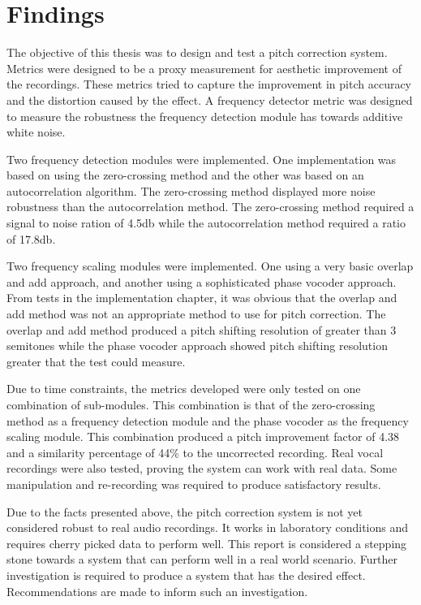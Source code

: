 
\section{Findings}

The objective of this thesis was to design and test a pitch correction system.
Metrics were designed to be a proxy measurement for aesthetic improvement of the
recordings. These metrics tried to capture the improvement in pitch accuracy and
the distortion caused by the effect. A frequency detector metric was designed to
measure the robustness the frequency detection module has towards additive white
noise.

Two frequency detection modules were implemented. One implementation was based on
using the zero-crossing method and the other was based on an autocorrelation
algorithm. The zero-crossing method displayed more noise robustness than the
autocorrelation method. The zero-crossing method required a signal to noise ration
of 4.5db while the autocorrelation method required a ratio of 17.8db.

Two frequency scaling modules were implemented. One using a very basic overlap and
add approach, and another using a sophisticated phase vocoder approach. From tests
in the implementation chapter, it was obvious that the overlap and add method was
not an appropriate method to use for pitch correction. The overlap and add method
produced a pitch shifting resolution of greater than 3 semitones while the phase
vocoder approach showed pitch shifting resolution greater that the test could
measure.

Due to time constraints, the metrics developed were only tested on one combination
of sub-modules. This combination is that of the zero-crossing method as a
frequency detection module and the phase vocoder as the frequency scaling module.
This combination produced a pitch improvement factor of 4.38 and a similarity
percentage of 44\% to the uncorrected recording. Real vocal recordings were also
tested, proving the system can work with real data. Some manipulation and
re-recording was required to produce satisfactory results.

Due to the facts presented above, the pitch correction system is not yet
considered robust to real audio recordings. It works in laboratory conditions and
requires cherry picked data to perform well. This report is considered a stepping
stone towards a system that can perform well in a real world scenario. Further
investigation is required to produce a system that has the desired effect.
Recommendations are made to inform such an investigation.

